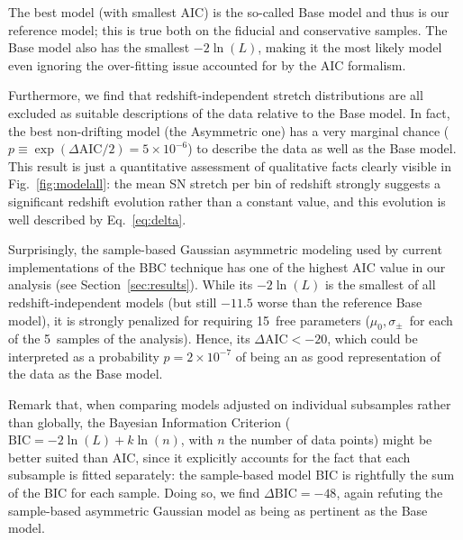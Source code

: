 \documentclass[]{aa}
\begin{document}
The best model (with smallest AIC) is the so-called Base model and thus is our
reference model; this is true both on the fiducial and conservative samples.
The Base model also has the smallest $-2\ln(L)$, making it the most likely
model even ignoring the over-fitting issue accounted for by the AIC formalism.

Furthermore, we find that redshift-independent stretch distributions are all
excluded as suitable descriptions of the data relative to the Base model.  In
fact, the best non-drifting model (the Asymmetric one) has a very marginal
chance ($p \equiv \exp\left(\Delta\mathrm{AIC}/2\right) = 5\times10^{-6}$) to
describe the data as well as the Base model. This result is just a quantitative
assessment of qualitative facts clearly visible in Fig.~\ref{fig:modelall}: the
mean SN stretch per bin of redshift strongly suggests a significant redshift
evolution rather than a constant value, and this evolution is well described by
Eq.~\ref{eq:delta}.

Surprisingly, the sample-based Gaussian asymmetric modeling used by current
implementations of the BBC technique \citep{scolnic2016, kessler2017} has one of
the highest AIC value in our analysis (see Section~\ref{sec:results}). While its
$-2\ln(L)$ is the smallest of all redshift-independent models (but still $-11.5$
worse than the reference Base model), it is strongly penalized for requiring
15~free parameters ($\mu_0, \sigma_{\pm}$~for each of the 5~samples of the
analysis). Hence, its $\Delta\mathrm{AIC}<-20$, which could be interpreted as a
probability $p=2\times 10^{-7}$ of being an as good representation of the data
as the Base model.

Remark that, when comparing models adjusted on individual subsamples rather than
globally, the Bayesian Information Criterion ($\mathrm{BIC} = -2\ln(L) +
k\ln(n)$, with $n$ the number of data points) might be better suited than AIC,
since it explicitly accounts for the fact that each subsample is fitted
separately: the sample-based model BIC is rightfully the sum of the BIC for each
sample. Doing so, we find $\Delta\mathrm{BIC}=-48$, again refuting the
sample-based asymmetric Gaussian model as being as pertinent as the Base model.
\end{document}
